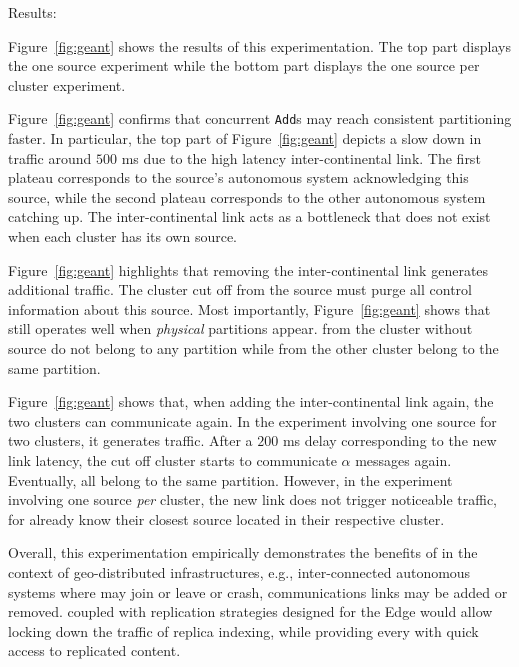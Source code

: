\begin{asparadesc}
\item [Results:]

Figure~\ref{fig:geant} shows the results of this experimentation. The
top part displays the one source experiment while the bottom part
displays the one source per cluster experiment.

\noindent Figure~\ref{fig:geant} confirms that concurrent
\texttt{Add}s may reach consistent partitioning faster. In particular,
the top part of Figure~\ref{fig:geant} depicts a slow down in traffic
around $500$ ms due to the high latency inter-continental link. The
first plateau corresponds to the source's autonomous system
acknowledging this source, while the second plateau corresponds to the
other autonomous system catching up.  The inter-continental link acts
as a bottleneck that does not exist when each cluster has its own
source.

\noindent Figure~\ref{fig:geant} highlights that removing the
inter-continental link generates additional traffic. The cluster cut
off from the source must purge all control information about this
source.  Most importantly, Figure~\ref{fig:geant} shows that \NAME
still operates well when \emph{physical} partitions appear. \Processes
from the cluster without source do not belong to any partition while
\processes from the other cluster belong to the same partition. 

\noindent Figure~\ref{fig:geant} shows that, when adding the
inter-continental link again, the two clusters can communicate
again. In the experiment involving one source for two clusters, it
generates traffic. After a $200$ ms delay corresponding to
the new link latency, the cut off cluster starts to communicate
$\alpha$ messages again. Eventually, all \processes belong to the same
partition. However, in the experiment involving one source \emph{per}
cluster, the new link does not trigger noticeable traffic, for
\processes already know their closest source located in their
respective cluster.

\noindent Overall, this experimentation empirically demonstrates the
benefits of \NAME in the context of geo-distributed infrastructures,
e.g., inter-connected autonomous systems where \processes may join or
leave or crash, communications links may be added or removed. \NAME
coupled with replication strategies designed for the Edge would allow
locking down the traffic of replica indexing, while providing every
\process with quick access to replicated content.

\end{asparadesc}

